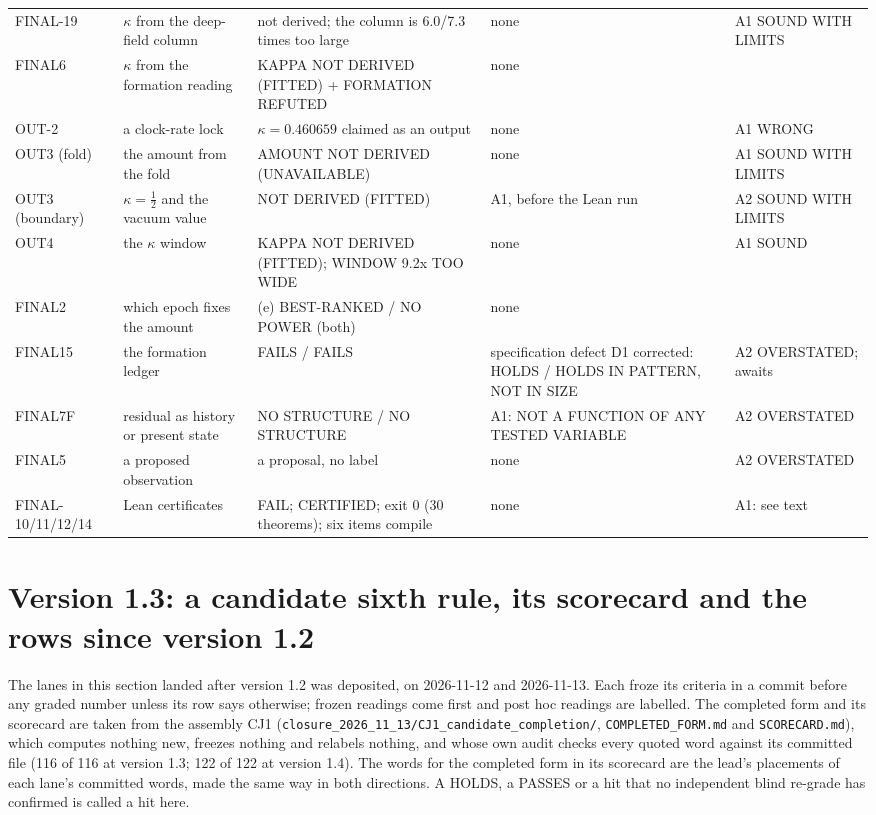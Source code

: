 \documentclass[10pt]{article}
\begin{document}
{\begin{longtable}{@{}p{1.5cm}p{3.2cm}p{4.3cm}p{3.3cm}p{3.2cm}@{}}
FINAL-19 & $\kappa$ from the deep-field column & not derived; the column is 6.0/7.3 times too large & none & A1 SOUND WITH LIMITS\\
FINAL6 & $\kappa$ from the formation reading & KAPPA NOT DERIVED (FITTED) + FORMATION REFUTED & none & \\
OUT-2 & a clock-rate lock & $\kappa=0.460659$ claimed as an output & none & A1 WRONG\\
OUT3 (fold) & the amount from the fold & AMOUNT NOT DERIVED (UNAVAILABLE) & none & A1 SOUND WITH LIMITS\\
OUT3 (boundary) & $\kappa=\tfrac12$ and the vacuum value & NOT DERIVED (FITTED) & A1, before the Lean run & A2 SOUND WITH LIMITS\\
OUT4 & the $\kappa$ window & KAPPA NOT DERIVED (FITTED); WINDOW 9.2x TOO WIDE & none & A1 SOUND\\
FINAL2 & which epoch fixes the amount & (e) BEST-RANKED / NO POWER (both) & none & \\
FINAL15 & the formation ledger & FAILS / FAILS & specification defect D1 corrected: HOLDS / HOLDS IN PATTERN, NOT IN SIZE & A2 OVERSTATED; awaits\\
FINAL7F & residual as history or present state & NO STRUCTURE / NO STRUCTURE & A1: NOT A FUNCTION OF ANY TESTED VARIABLE & A2 OVERSTATED\\
FINAL5 & a proposed observation & a proposal, no label & none & A2 OVERSTATED\\
FINAL-10/11/12/14 & Lean certificates & FAIL; CERTIFIED; exit 0 (30 theorems); six items compile & none & A1: see text\\\bottomrule
\end{longtable}}

\section{Version 1.3: a candidate sixth rule, its scorecard and the rows since version 1.2}
The lanes in this section landed after version 1.2 was deposited, on 2026-11-12 and 2026-11-13. Each froze its criteria in a commit before any graded number unless its row says otherwise; frozen readings come first and post hoc readings are labelled. The completed form and its scorecard are taken from the assembly CJ1 (\texttt{closure\_2026\_11\_13/CJ1\_candidate\_completion/}, \texttt{COMPLETED\_FORM.md} and \texttt{SCORECARD.md}), which computes nothing new, freezes nothing and relabels nothing, and whose own audit checks every quoted word against its committed file (116 of 116 at version 1.3; 122 of 122 at version 1.4). The words for the completed form in its scorecard are the lead's placements of each lane's committed words, made the same way in both directions. A HOLDS, a PASSES or a hit that no independent blind re-grade has confirmed is called a hit here.
\end{document}
